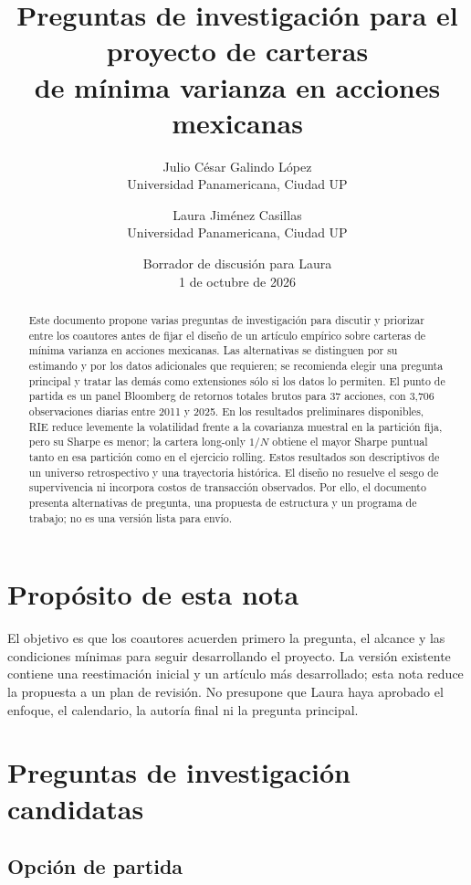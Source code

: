 \documentclass[11pt]{article}
\title{Preguntas de investigación para el proyecto de carteras\\
de mínima varianza en acciones mexicanas}
\author{Julio César Galindo López\\
\small Universidad Panamericana, Ciudad UP
\and
Laura Jiménez Casillas\\
\small Universidad Panamericana, Ciudad UP}
\date{Borrador de discusión para Laura\\1 de octubre de 2026}
\begin{document}
\maketitle

\begin{abstract}
\noindent
Este documento propone varias preguntas de investigación para discutir y
priorizar entre los coautores antes de fijar el diseño de un artículo
empírico sobre carteras de mínima varianza en acciones mexicanas. Las
alternativas se distinguen por su estimando y por los datos adicionales que
requieren; se recomienda elegir una pregunta principal y tratar las demás
como extensiones sólo si los datos lo permiten.
El punto de partida es un panel Bloomberg de retornos totales brutos para 37
acciones, con 3,706 observaciones diarias entre 2011 y 2025. En los resultados
preliminares disponibles, RIE reduce levemente la volatilidad frente a la
covarianza muestral en la partición fija, pero su Sharpe es menor; la cartera
long-only $1/N$ obtiene el mayor Sharpe puntual tanto en esa partición como en
el ejercicio rolling. Estos resultados son descriptivos de un universo
retrospectivo y una trayectoria histórica. El diseño no resuelve el sesgo de
supervivencia ni incorpora costos de transacción observados. Por ello, el
documento presenta alternativas de pregunta, una propuesta de estructura y
un programa de trabajo; no es una versión lista para envío.
\end{abstract}

\section{Propósito de esta nota}

El objetivo es que los coautores acuerden primero la pregunta, el alcance y
las condiciones mínimas para seguir desarrollando el proyecto. La versión
existente contiene una reestimación inicial y un artículo más desarrollado;
esta nota reduce la propuesta a un plan de revisión. No presupone que Laura
haya aprobado el enfoque, el calendario, la autoría final ni la pregunta
principal.

\section{Preguntas de investigación candidatas}

\subsection{Opción de partida}
\end{document}
